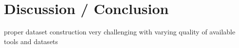 \chapter{\label{ch:6-conclusion}Discussion / Conclusion}

proper dataset construction very challenging with varying quality of available tools and datasets